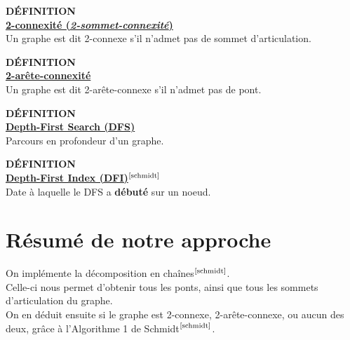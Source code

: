 \documentclass{article}      %
\begin{document}
\begin{definition}
{ \scriptsize \textcolor{definition}{ \textbf{DÉFINITION}}}
\vspace{3px}
\\ \underline{\textbf{2-connexité (\textit{2-sommet-connexité})}}
\vspace{2.5px}
\\ Un graphe est dit 2-connexe s'il n'admet pas de sommet d'articulation.
\end{definition}

\begin{definition}
{ \scriptsize \textcolor{definition}{ \textbf{DÉFINITION}}}
\vspace{3px}
\\ \underline{\textbf{2-arête-connexité}}
\vspace{2.5px}
\\ Un graphe est dit 2-arête-connexe s'il n'admet pas de pont.
\end{definition}

\begin{definition}
{ \scriptsize \textcolor{definition}{ \textbf{DÉFINITION}}}
\vspace{3px}
\\ \underline{\textbf{Depth-First Search (DFS)}}
\vspace{2.5px}
\\ Parcours en profondeur d'un graphe.
\end{definition}

\begin{definition}
{ \scriptsize \textcolor{definition}{ \textbf{DÉFINITION}}}
\vspace{3px}
\\ \underline{\textbf{Depth-First Index (DFI)$^\text{\cite{schmidt}}$}}
\vspace{2.5px}
\\ Date à laquelle le DFS a \textbf{débuté} sur un noeud.
\end{definition}

\section{Résumé de notre approche}
On implémente la décomposition en chaînes$^\text{\cite{schmidt}}$.
\\Celle-ci nous permet d'obtenir tous les ponts, ainsi que tous les sommets d'articulation du graphe.
\\On en déduit ensuite si le graphe est 2-connexe, 2-arête-connexe, ou aucun des deux, grâce à l'Algorithme 1 de Schmidt$^\text{\cite{schmidt}}$.
%
\end{document}
